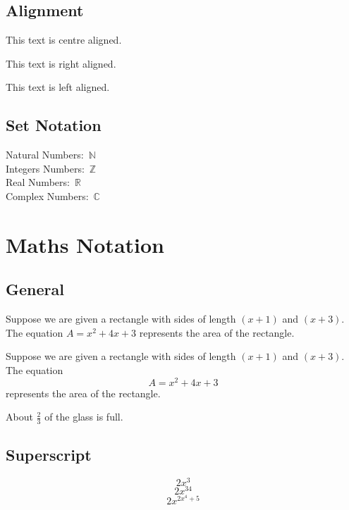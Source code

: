 \documentclass[11pt]{article}
\begin{document}
\subsection{Alignment}
\begin{center} This text is centre aligned. \end{center}
\begin{flushright} This text is right aligned. \end{flushright}
\begin{flushleft} This text is left aligned. \end{flushleft}

\subsection{Set Notation}
Natural Numbers:\ $\mathbb{N}$\\
Integers Numbers:\ $\mathbb{Z}$\\
Real Numbers:\ $\mathbb{R}$\\
Complex Numbers:\ $\mathbb{C}$\\
\newpage
\section{Maths Notation}
\subsection{General}
Suppose we are given a rectangle with sides of length $(x+1)$ and $(x+3)$. The equation $A=x^2+4x+3$ represents the area of the rectangle.\newline

Suppose we are given a rectangle with sides of length $(x+1)$ and $(x+3)$. The equation $$A=x^2+4x+3$$ represents the area of the rectangle.\newline

About $\displaystyle{\frac{2}{3}}$ of the glass is full.\newline

\subsection{Superscript}
$$2x^3$$
$$2x^{34}$$
$$2x^{2x^4+5}$$
\end{document}
